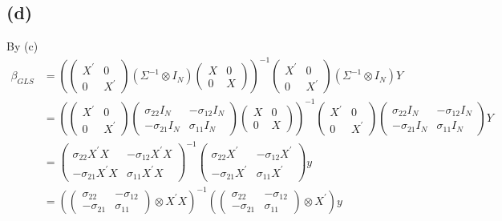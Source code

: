 \documentclass{article}
\begin{document}
\subsection{(d)}
By (c)
\begin{align*}
	\beta_{GLS} &= \left(\left(\begin{array}{cc} X^{'} & 0 \\ 0 & X^{'} \end{array}\right) \left(\Sigma^{-1} \otimes I_N \right) \left(\begin{array}{cc} X & 0 \\ 0 & X \end{array}\right)\right)^{-1} \left(\begin{array}{cc} X^{'} & 0 \\ 0 & X^{'} \end{array}\right) \left(\Sigma^{-1} \otimes I_N \right) Y\\[8pt]
	&= \left(\left(\begin{array}{cc} X^{'} & 0 \\ 0 & X^{'} \end{array}\right) \left(\begin{array}{cc} \sigma_{22}I_N & -\sigma_{12}I_N \\ -\sigma_{21} I_N & \sigma_{11} I_N \end{array}\right) \left(\begin{array}{cc} X & 0 \\ 0 & X \end{array}\right)\right)^{-1} \left(\begin{array}{cc} X^{'} & 0 \\ 0 & X^{'} \end{array}\right) \left(\begin{array}{cc} \sigma_{22}I_N & -\sigma_{12}I_N \\ -\sigma_{21} I_N & \sigma_{11} I_N \end{array}\right) Y\\[8pt]
	&= \left( \begin{array}{cc} \sigma_{22}X^{'}X & -\sigma_{12} X^{'}X \\ -\sigma_{21}X^{'}X & \sigma_{11}X^{'}X \end{array} \right)^{-1} \left( \begin{array}{cc} \sigma_{22}X^{'} & -\sigma_{12} X^{'} \\ -\sigma_{21}X^{'} & \sigma_{11}X^{'} \end{array} \right) y\\[8pt]
	&= \left(\left( \begin{array}{cc} \sigma_{22} & -\sigma_{12} \\ -\sigma_{21} & \sigma_{11} \end{array} \right) \otimes X^{'}X\right)^{-1} \left(\left( \begin{array}{cc} \sigma_{22} & -\sigma_{12} \\ -\sigma_{21} & \sigma_{11} \end{array} \right) \otimes X^{'} \right) y\\[8pt]

\end{align*}
\end{document}
